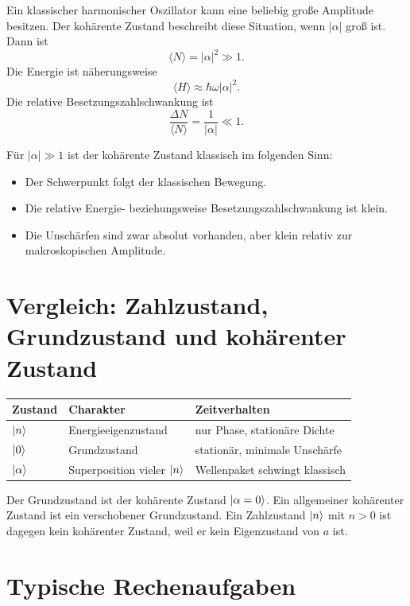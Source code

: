 Ein klassischer harmonischer Oszillator kann eine beliebig große Amplitude besitzen. Der kohärente Zustand beschreibt diese Situation, wenn \(|\alpha|\) groß ist. Dann ist
\[
    \langle N\rangle=|\alpha|^2\gg 1.
\]
Die Energie ist näherungsweise
\[
    \langle H\rangle\approx \hbar\omega |\alpha|^2.
\]
Die relative Besetzungszahlschwankung ist
\[
    \frac{\Delta N}{\langle N\rangle}=\frac{1}{|\alpha|}\ll 1.
\]

\begin{conceptbox}
Für \(|\alpha|\gg 1\) ist der kohärente Zustand klassisch im folgenden Sinn:
\begin{itemize}
    \item Der Schwerpunkt folgt der klassischen Bewegung.
    \item Die relative Energie- beziehungsweise Besetzungszahlschwankung ist klein.
    \item Die Unschärfen sind zwar absolut vorhanden, aber klein relativ zur makroskopischen Amplitude.
\end{itemize}
\end{conceptbox}

\section{Vergleich: Zahlzustand, Grundzustand und kohärenter Zustand}

\begin{center}
\begin{tabular}{lll}
\toprule
Zustand & Charakter & Zeitverhalten \\
\midrule
\(\left|n\right\rangle\) & Energieeigenzustand & nur Phase, stationäre Dichte \\
\(\left|0\right\rangle\) & Grundzustand & stationär, minimale Unschärfe \\
\(\left|\alpha\right\rangle\) & Superposition vieler \(\left|n\right\rangle\) & Wellenpaket schwingt klassisch \\
\bottomrule
\end{tabular}
\end{center}

\begin{notebox}
Der Grundzustand ist der kohärente Zustand \(\left|\alpha=0\right\rangle\). Ein allgemeiner kohärenter Zustand ist ein verschobener Grundzustand. Ein Zahlzustand \(\left|n\right\rangle\) mit \(n>0\) ist dagegen kein kohärenter Zustand, weil er kein Eigenzustand von \(a\) ist.
\end{notebox}

\section{Typische Rechenaufgaben}

